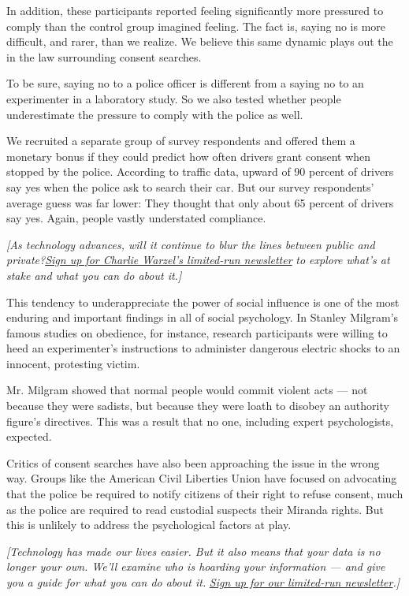 In addition, these participants reported feeling significantly more
pressured to comply than the control group imagined feeling. The fact
is, saying no is more difficult, and rarer, than we realize. We believe
this same dynamic plays out the in the law surrounding consent searches.

To be sure, saying no to a police officer is different from a saying no
to an experimenter in a laboratory study. So we also tested whether
people underestimate the pressure to comply with the police as well.

We recruited a separate group of survey respondents and offered them a
monetary bonus if they could predict how often drivers grant consent
when stopped by the police. According to traffic data, upward of 90
percent of drivers say yes when the police ask to search their car. But
our survey respondents' average guess was far lower: They thought that
only about 65 percent of drivers say yes. Again, people vastly
understated compliance.

\emph{{[}As technology advances, will it continue to blur the lines
between public and
private?}\href{https://www.nytimes.com/newsletters/privacy-project?action=click\&module=inline\&pgtype=Article}{\emph{Sign
up for Charlie Warzel's limited-run newsletter}} \emph{to explore what's
at stake and what you can do about it.{]}}

This tendency to underappreciate the power of social influence is one of
the most enduring and important findings in all of social psychology. In
Stanley Milgram's famous studies on obedience, for instance, research
participants were willing to heed an experimenter's instructions to
administer dangerous electric shocks to an innocent, protesting victim.

Mr. Milgram showed that normal people would commit violent acts --- not
because they were sadists, but because they were loath to disobey an
authority figure's directives. This was a result that no one, including
expert psychologists, expected.

Critics of consent searches have also been approaching the issue in the
wrong way. Groups like the American Civil Liberties Union have focused
on advocating that the police be required to notify citizens of their
right to refuse consent, much as the police are required to read
custodial suspects their Miranda rights. But this is unlikely to address
the psychological factors at play.

\emph{{[}Technology has made our lives easier. But it also means that
your data is no longer your own. We'll examine who is hoarding your
information --- and give you a guide for what you can do about it.}
\href{https://www.nytimes.com/newsletters/privacy-project?action=click\&module=Intentional\&pgtype=Article}{\emph{Sign
up for our limited-run newsletter}}\emph{.{]}}

